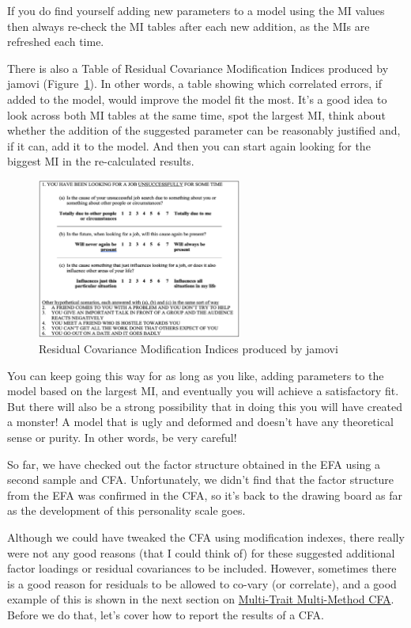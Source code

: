 \documentclass[
  a4paper,
]{book}
\begin{document}
If you do find yourself adding new parameters to a model using the MI
values then always re-check the MI tables after each new addition, as
the MIs are refreshed each time.

There is also a Table of Residual Covariance Modification Indices
produced by jamovi (Figure~\ref{fig-fig15-19}). In other words, a table
showing which correlated errors, if added to the model, would improve
the model fit the most. It's a good idea to look across both MI tables
at the same time, spot the largest MI, think about whether the addition
of the suggested parameter can be reasonably justified and, if it can,
add it to the model. And then you can start again looking for the
biggest MI in the re-calculated results.

\begin{figure}

\includegraphics[width=0.6\textwidth,height=\textheight]{images/fig15-19.png} \hfill{}

\caption{\label{fig-fig15-19}Residual Covariance Modification Indices
produced by jamovi}

\end{figure}

You can keep going this way for as long as you like, adding parameters
to the model based on the largest MI, and eventually you will achieve a
satisfactory fit. But there will also be a strong possibility that in
doing this you will have created a monster! A model that is ugly and
deformed and doesn't have any theoretical sense or purity. In other
words, be very careful!

So far, we have checked out the factor structure obtained in the EFA
using a second sample and CFA. Unfortunately, we didn't find that the
factor structure from the EFA was confirmed in the CFA, so it's back to
the drawing board as far as the development of this personality scale
goes.

Although we could have tweaked the CFA using modification indexes, there
really were not any good reasons (that I could think of) for these
suggested additional factor loadings or residual covariances to be
included. However, sometimes there is a good reason for residuals to be
allowed to co-vary (or correlate), and a good example of this is shown
in the next section on
\protect\hyperlink{multi-trait-multi-method-cfa}{Multi-Trait
Multi-Method CFA}. Before we do that, let's cover how to report the
results of a CFA.
\end{document}
